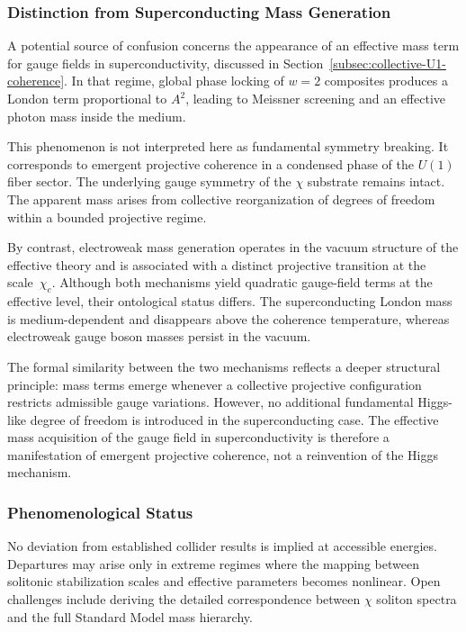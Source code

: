   \subsubsection*{Distinction from Superconducting Mass Generation}

    A potential source of confusion concerns the appearance of an
    effective mass term for gauge fields in superconductivity,
    discussed in Section~\ref{subsec:collective-U1-coherence}.
    In that regime, global phase locking of $w=2$ composites produces
    a London term proportional to $A^2$, leading to Meissner screening
    and an effective photon mass inside the medium.

    This phenomenon is not interpreted here as fundamental symmetry breaking.
    It corresponds to emergent projective coherence in a condensed phase
    of the $U(1)$ fiber sector.
    The underlying gauge symmetry of the $\chi$ substrate remains intact.
    The apparent mass arises from collective reorganization of degrees
    of freedom within a bounded projective regime.

    By contrast, electroweak mass generation operates in the vacuum
    structure of the effective theory and is associated with a distinct
    projective transition at the scale~$\chi_c$.
    Although both mechanisms yield quadratic gauge-field terms at the
    effective level, their ontological status differs.
    The superconducting London mass is medium-dependent and
    disappears above the coherence temperature,
    whereas electroweak gauge boson masses persist in the vacuum.

    The formal similarity between the two mechanisms reflects a deeper
    structural principle:
    mass terms emerge whenever a collective projective configuration
    restricts admissible gauge variations.
    However, no additional fundamental Higgs-like degree of freedom
    is introduced in the superconducting case.
    The effective mass acquisition of the gauge field in
    superconductivity is therefore a manifestation of emergent
    projective coherence, not a reinvention of the Higgs mechanism.

  \subsubsection*{Phenomenological Status}
    \label{subsec:phenomenological-implications}
    \label{subsec:higgs-summary}

    No deviation from established collider results is implied at accessible
    energies.
    Departures may arise only in extreme regimes where the mapping between
    solitonic stabilization scales and effective parameters becomes nonlinear.
    Open challenges include deriving the detailed correspondence between
    $\chi$ soliton spectra and the full Standard Model mass hierarchy.
